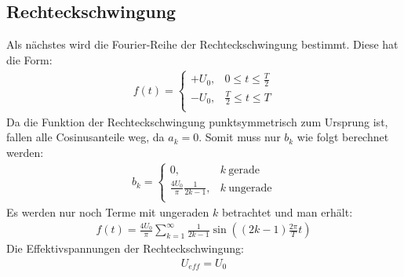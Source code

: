 \subsection*{Rechteckschwingung}
\label{sub:square}
Als nächstes wird die Fourier-Reihe der Rechteckschwingung bestimmt. Diese hat die Form:
\begin{gather}
    f(t) = 
    \begin{cases}
        +U_0, & 0 \leq t \leq \frac{T}{2} \\
        -U_0, & \frac{T}{2} \leq t \leq T \\
    \end{cases}
\end{gather}
Da die Funktion der Rechteckschwingung punktsymmetrisch zum Ursprung ist, fallen alle Cosinusanteile weg, da $a_k = 0$. Somit muss nur $b_k$ wie folgt berechnet werden:
\begin{gather}
    b_k =
    \begin{cases}
        0, & k~\text{gerade}\\
        \frac{4U_0}{\pi}\frac{1}{2k-1}, & k~\text{ungerade}\\
    \end{cases}
\end{gather} 
Es werden nur noch Terme mit ungeraden $k$ betrachtet und man erhält:
\begin{gather}
    \boxed{f(t) = \frac{4U_0}{\pi} \sum^{\infty}_{k=1} \frac{1}{2k-1} \sin((2k-1)\frac{2\pi}{T}t)}
\end{gather}
Die Effektivspannungen der Rechteckschwingung:
\begin{gather}
    \boxed{U_{eff} = U_0}
\end{gather}
